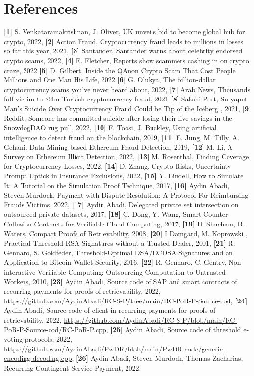 
\section*{References}
%
\textbf{[1]} S. Venkataramakrishnan, J. Oliver, UK unveils bid to become global hub for crypto, 2022, \textbf{[2]} Action Fraud, Cryptocurrency fraud leads to millions in losses so far this year, 2021, \textbf{[3]} Santander, Santander warns about celebrity endorsed crypto scams, 2022, \textbf{[4]} E. Fletcher, Reports show scammers cashing in on crypto craze, 2022
\textbf{[5]} D. Gilbert, Inside the QAnon Crypto Scam That Cost People Millions and One Man His Life, 2022 
\textbf{[6]} G. Olukya, The billion-dollar cryptocurrency scams you’ve never heard about, 2022,
\textbf{[7]} Arab News, Thousands fall victim to \$2bn Turkish cryptocurrency fraud, 2021
\textbf{[8]} Sakshi Post, Suryapet Man's Suicide Over Cryptocurrency Fraud Could be Tip of the Iceberg , 2021, \textbf{[9]} Reddit, Someone has committed suicide after losing their live savings in the SnowdogDAO rug pull, 2022, \textbf{[10]} F. Toosi, J. Buckley, Using artificial intelligence to detect fraud on the blockchain, 2019, \textbf{[11]} E. Jung, M. Tilly, A. Gehani, Data Mining-based Ethereum Fraud Detection, 2019, \textbf{[12]} M. Li, A Survey on Ethereum Illicit Detection, 2022, \textbf{[13]} M. Rosenthal, Finding Coverage for Cryptocurrency Losses, 2022, \textbf{[14]} D. Zhang, Crypto Risks, Uncertainty Prompt Uptick in Insurance Exclusions, 2022, \textbf{[15]} Y. Lindell, How to Simulate It: A Tutorial on the Simulation Proof Technique, 2017, \textbf{[16]} Aydin Abadi, Steven Murdoch, Payment with Dispute Resolution: A Protocol For Reimbursing Frauds Victims, 2022, \textbf{[17]} Aydin Abadi, Delegated private set intersection on outsourced private datasets, 2017, \textbf{[18]} C. Dong, Y. Wang, Smart Counter-Collusion Contracts for Verifiable Cloud Computing, 2017, \textbf{[19]} H. Shacham, B. Waters, Compact Proofs of Retrievability, 2008, \textbf{[20]} I Damgard, M. Koprowski , Practical Threshold RSA Signatures without a Trusted Dealer, 2001, \textbf{[21]} R. Gennaro, S. Goldfeder, Threshold-Optimal DSA/ECDSA Signatures and an Application to Bitcoin Wallet Security, 2016,  \textbf{[22]} R. Gennaro, C. Gentry, Non-interactive Verifiable Computing: Outsourcing Computation to Untrusted Workers, 2010, \textbf{[23]} Aydin Abadi, Source code of SAP and smart contracts of recurring payments for proofs of retrievability, 2022, \href{https://github.com/AydinAbadi/RC-S-P/tree/main/RC-PoR-P-Source-cod}{https://github.com/AydinAbadi/RC-S-P/tree/main/RC-PoR-P-Source-cod}, \textbf{[24]} Aydin Abadi, Source code of client in recurring payments for proofs of retrievability, 2022, \href{https://github.com/AydinAbadi/RC-S-P/blob/main/RC-PoR-P-Source-cod/RC-PoR-P.cpp}{https://github.com/AydinAbadi/RC-S-P/blob/main/RC-PoR-P-Source-cod/RC-PoR-P.cpp}, \textbf{[25]} Aydin Abadi, Source code of threshold e-voting protocols, 2022, \href{https://github.com/AydinAbadi/PwDR/blob/main/PwDR-code/generic-encoding-decoding.cpp}{https://github.com/AydinAbadi/PwDR/blob/main/PwDR-code/generic-encoding-decoding.cpp}, \textbf{[26]} Aydin Abadi, Steven Murdoch, Thomas Zacharias, Recurring Contingent Service Payment, 2022. 


